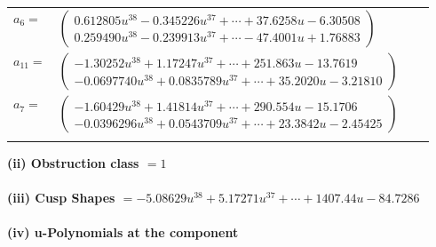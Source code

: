 \documentclass[1p]{elsarticle_modified}
\theoremstyle{definition}
\begin{document}
\begin{tabular}{m{7pt} m{180pt} m{7pt} m{180pt} }
\flushright $a_{6}=$&$\begin{pmatrix}0.612805 u^{38}-0.345226 u^{37}+\cdots+37.6258 u-6.30508\\0.259490 u^{38}-0.239913 u^{37}+\cdots-47.4001 u+1.76883\end{pmatrix}$ \\
\flushright $a_{11}=$&$\begin{pmatrix}-1.30252 u^{38}+1.17247 u^{37}+\cdots+251.863 u-13.7619\\-0.0697740 u^{38}+0.0835789 u^{37}+\cdots+35.2020 u-3.21810\end{pmatrix}$ \\
\flushright $a_{7}=$&$\begin{pmatrix}-1.60429 u^{38}+1.41814 u^{37}+\cdots+290.554 u-15.1706\\-0.0396296 u^{38}+0.0543709 u^{37}+\cdots+23.3842 u-2.45425\end{pmatrix}$\\&\end{tabular}
\flushleft \textbf{(ii) Obstruction class $= 1$}\\~\\
\flushleft \textbf{(iii) Cusp Shapes $= -5.08629 u^{38}+5.17271 u^{37}+\cdots+1407.44 u-84.7286$}\\~\\
\newpage\renewcommand{\arraystretch}{1}
\flushleft \textbf{(iv) u-Polynomials at the component}\newline \\
\end{document}
